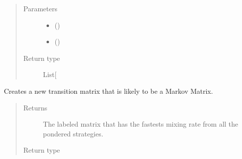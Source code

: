 \documentclass[letterpaper,10pt,english]{sphinxmanual}
\begin{document}
\begin{fulllineitems}
\begin{fulllineitems}
\begin{quote}
\begin{description}
\item[{Parameters}] \leavevmode\begin{itemize}
\item {} 
 (\sphinxstyleliteralemphasis{\sphinxupquote{{[}}}\sphinxstyleliteralemphasis{\sphinxupquote{{]}}}) \textendash{} 

\item {} 
 (\sphinxstyleliteralemphasis{\sphinxupquote{{[}}}\sphinxstyleliteralemphasis{\sphinxupquote{{]}}}) \textendash{} 

\end{itemize}

\item[{Return type}] \leavevmode
List{[}\sphinxhref{https://docs.python.org/3.7/library/functions.html\#float}{float}{]}

\end{description}\end{quote}

\end{fulllineitems}


\begin{fulllineitems}
\label{\detokenize{app.domain:app.domain.cluster_groups.SGCluster.new_transition_matrix}}
Creates a new transition matrix that is likely to be a Markov Matrix.
\begin{quote}\begin{description}
\item[{Returns}] \leavevmode
The labeled matrix that has the fastests mixing rate from all
the pondered strategies.

\item[{Return type}] \leavevmode
{}

\end{description}\end{quote}


\end{fulllineitems}
\end{fulllineitems}
\end{document}
